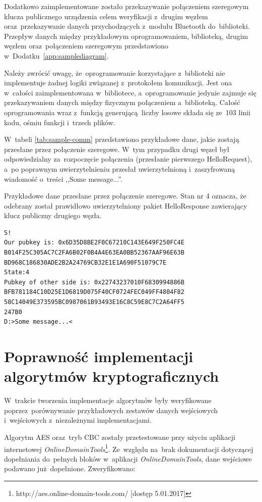 Dodatkowo zaimplementowane zostało przekazywanie połączeniem szeregowym klucza publicznego urządzenia celem weryfikacji z~drugim węzłem oraz~przekazywanie danych przychodzących z~modułu Bluetooth do~biblioteki. Przepływ danych między przykładowym oprogramowaniem, biblioteką, drugim węzłem oraz~połączeniem szeregowym przedstawiono w~Dodatku~\ref{app:samplediagram}.

Należy zwrócić uwagę, że~oprogramowanie korzystające z~biblioteki nie implementuje żadnej logiki związanej z~protokołem komunikacji. Jest ona w~całości zaimplementowana w~bibliotece, a~oprogramowanie jedynie zajmuje się przekazywaniem danych między fizycznym połączeniem a~biblioteką. Całość oprogramowania wraz z~funkcją generującą liczby losowe składa się ze~103 linii kodu, ośmiu funkcji i~trzech plików.

W~tabeli \ref{tab:sample-comm} przedstawiono przykładowe dane, jakie zostają przesłane przez połączenie szeregowe. W~tym przypadku drugi węzeł był odpowiedzialny za~rozpoczęcie połączenia (przesłanie pierwszego HelloRequest), a~po poprawnym uwierzytelnieniu przesłał uwierzytelnioną i~zaszyfrowaną wiadomość o~treści ,,Some message...''.

\begin{table}
\centering
\caption{Przykładowe dane przesłane przez połączenie szeregowe. Stan nr 4 oznacza, że odebrany został prawidłowo uwierzytelniony pakiet HelloResponse zawierający klucz publiczny drugiego węzła.}
\begin{BVerbatim}
S!
Our pubkey is: 0x6D35D8BE2F0C67210C143E649F250FC4E
B014F25C305AC7C2FA6B02F0B4A4E63EA0BB52367AAF96E63B
BD968C186830ADE2B2A24769CB32E1E1A690F51079C7E
State:4
Pubkey of other side is: 0x22743237010F6830994886B
BFB781184C10D25E1D6819D075F40CF0724FEC049FF4804F82
58C14049E373595BC0987061B93493E16C8C59E8C7C2A64FF5
247B0
D:>Some message...<
\end{BVerbatim}
\label{tab:sample-comm}
\end{table}

\section{Poprawność implementacji algorytmów kryptograficznych}

W~trakcie tworzenia implementacje algorytmów były weryfikowane poprzez~porównywanie przykładowych zestawów danych wejściowych i~wejściowych z~niezależnymi implementacjami.

Algorytm AES oraz~tryb CBC zostały przetestowane przy użyciu aplikacji internetowej \emph{OnlineDomainTools}\footnote{http://aes.online-domain-tools.com/ [dostęp 5.01.2017]}. Ze~względu na~brak dokumentacji dotyczącej dopełniania do~pełnych bloków w~aplikacji \emph{OnlineDomainTools}, dane wejściowe podawano już dopełnione. Zweryfikowano:

